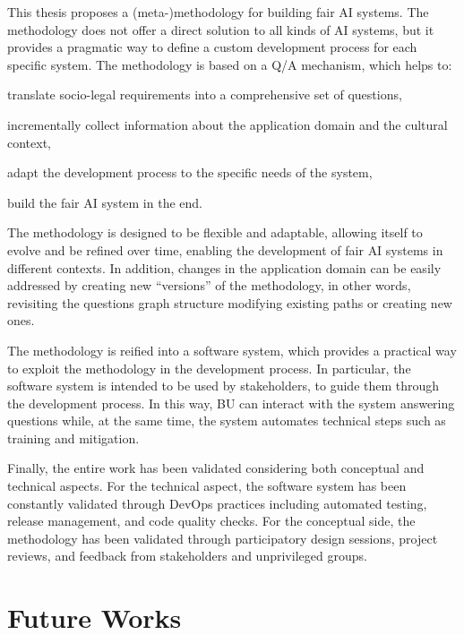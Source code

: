 \documentclass[12pt,a4paper,openright,twoside]{book}
\begin{document}
This thesis proposes a (meta-)methodology for building fair \ac{AI} systems.
%
The methodology does not offer a direct solution to all kinds of \ac{AI} systems, but it provides a pragmatic way to define a custom development process for each specific system.
%
The methodology is based on a \ac{Q/A} mechanism, which helps to:
\begin{enumerate*}[label=(\roman*)]
    \item translate socio-legal requirements into a comprehensive set of questions,
    \item incrementally collect information about the application domain and the cultural context,
    \item adapt the development process to the specific needs of the system,
    \item build the fair \ac{AI} system in the end.
\end{enumerate*}
%
The methodology is designed to be flexible and adaptable, allowing itself to evolve and be refined over time, enabling the development of fair \ac{AI} systems in different contexts.
%
In addition, changes in the application domain can be easily addressed by creating new ``versions'' of the methodology, in other words, revisiting the questions graph structure modifying existing paths or creating new ones.

The methodology is reified into a software system, which provides a practical way to exploit the methodology in the development process.
%
In particular, the software system is intended to be used by stakeholders, to guide them through the development process.
%
In this way, \acl{BU} can interact with the system answering questions while, at the same time, the system automates technical steps such as training and mitigation.

Finally, the entire work has been validated considering both conceptual and technical aspects.
%
For the technical aspect, the software system has been constantly validated through DevOps practices including automated testing, release management, and code quality checks.
%
For the conceptual side, the methodology has been validated through participatory design sessions, project reviews, and feedback from stakeholders and unprivileged groups.


\section{Future Works}
\end{document}
